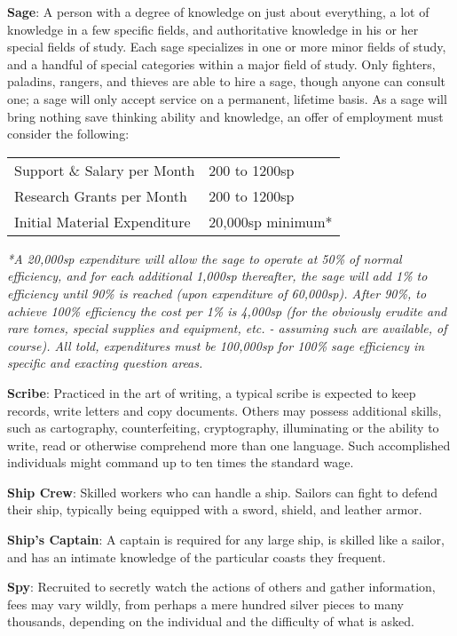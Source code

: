 \documentclass{article}
\begin{document}
\begin{multicols}{2}
\textbf{Sage}: A person with a degree of knowledge on just about
everything, a lot of knowledge in a few specific fields, and
authoritative knowledge in his or her special fields of study. Each sage
specializes in one or more minor fields of study, and a handful of
special categories within a major field of study. Only fighters,
paladins, rangers, and thieves are able to hire a sage, though anyone
can consult one; a sage will only accept service on a permanent,
lifetime basis. As a sage will bring nothing save thinking ability and
knowledge, an offer of employment must consider the following:

\begin{longtable}[]{@{}ll@{}}
\toprule\noalign{}
\endhead
\bottomrule\noalign{}
\endlastfoot
Support \& Salary per Month & 200 to 1200sp \\
Research Grants per Month & 200 to 1200sp \\
Initial Material Expenditure & 20,000sp minimum* \\
\end{longtable}

\emph{*A 20,000sp expenditure will allow the sage to operate at 50\% of
normal efficiency, and for each additional 1,000sp thereafter, the sage
will add 1\% to efficiency until 90\% is reached (upon expenditure of
60,000sp). After 90\%, to achieve 100\% efficiency the cost per 1\% is
4,000sp (for the obviously erudite and rare tomes, special supplies and
equipment, etc. - assuming such are available, of course). All told,
expenditures must be 100,000sp for 100\% sage efficiency in specific and
exacting question areas.}

\textbf{Scribe}: Practiced in the art of writing, a typical scribe is
expected to keep records, write letters and copy documents. Others may
possess additional skills, such as cartography, counterfeiting,
cryptography, illuminating or the ability to write, read or otherwise
comprehend more than one language. Such accomplished individuals might
command up to ten times the standard wage.

\textbf{Ship Crew}: Skilled workers who can handle a ship. Sailors can
fight to defend their ship, typically being equipped with a sword,
shield, and leather armor.

\textbf{Ship's Captain}: A captain is required for any large ship, is
skilled like a sailor, and has an intimate knowledge of the particular
coasts they frequent.

\textbf{Spy}: Recruited to secretly watch the actions of others and
gather information, fees may vary wildly, from perhaps a mere hundred
silver pieces to many thousands, depending on the individual and the
difficulty of what is asked.


\end{multicols}
\end{document}
